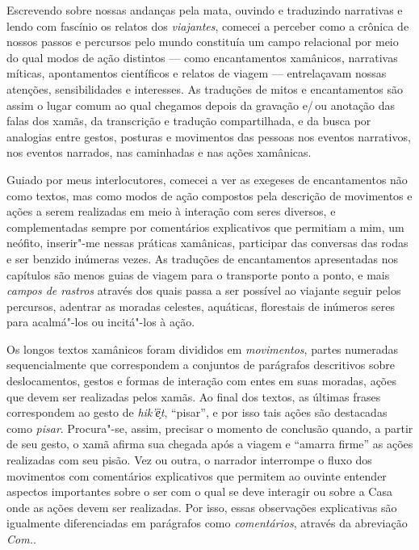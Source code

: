 Escrevendo sobre nossas andanças pela mata, ouvindo e traduzindo
narrativas e lendo com fascínio os relatos dos \textit{viajantes}, comecei a
perceber como a crônica de nossos passos e percursos pelo mundo
constituía um campo relacional por meio do qual modos de ação distintos
--- como encantamentos xamânicos, narrativas míticas, apontamentos
científicos e relatos de viagem --- entrelaçavam nossas atenções,
sensibilidades e interesses. As traduções de mitos e encantamentos são
assim o lugar comum ao qual chegamos depois da gravação e/\,ou anotação
das falas dos xamãs, da transcrição e tradução compartilhada, e da busca
por analogias entre gestos, posturas e movimentos das pessoas nos
eventos narrativos, nos eventos narrados, nas caminhadas e nas ações
xamânicas.

Guiado por meus interlocutores, comecei a ver as exegeses de
encantamentos não como textos, mas como modos de ação compostos pela
descrição de movimentos e ações a serem realizadas em meio à interação
com seres diversos, e complementadas sempre por comentários explicativos
que permitiam a mim, um neófito, inserir"-me nessas práticas xamânicas,
participar das conversas das rodas e ser benzido inúmeras vezes. As
traduções de encantamentos apresentadas nos capítulos são menos guias de
viagem para o transporte ponto a ponto, e mais \textit{campos de rastros}
através dos quais passa a ser possível ao viajante seguir pelos
percursos, adentrar as moradas celestes, aquáticas, florestais de
inúmeros seres para acalmá"-los ou incitá"-los à ação.

Os longos textos xamânicos foram divididos em \textit{movimentos},
partes numeradas sequencialmente que correspondem a conjuntos de
parágrafos descritivos sobre deslocamentos, gestos e formas de interação
com entes em suas moradas, ações que devem ser realizadas pelos xamãs.
Ao final dos textos, as últimas frases correspondem ao gesto de
\textit{hik'ë̗t}, ``pisar'', e por isso tais ações são destacadas como
\textit{pisar}. Procura"-se, assim, precisar o momento de conclusão quando,
a partir de seu gesto, o xamã afirma sua chegada após a viagem e
``amarra firme'' as ações realizadas com seu pisão. Vez ou outra, o
narrador interrompe o fluxo dos movimentos com comentários explicativos
que permitem ao ouvinte entender aspectos importantes sobre o ser com o
qual se deve interagir ou sobre a Casa onde as ações devem ser
realizadas. Por isso, essas observações explicativas são igualmente
diferenciadas em parágrafos como \textit{comentários}, através da abreviação \textit{Com.}.

